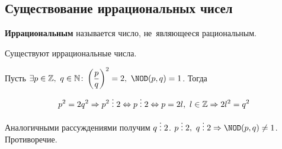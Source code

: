 \subsection{Существование иррациональных чисел}
\textbf{Иррациональным} называется число, не~являющееся рациональным.

\begin{statement}
Существуют иррациональные числа.
\end{statement}
\begin{proofcontra}
Пусть $\exists p \in \mathbb Z, \ q \in \mathbb N \colon
\left( \dfrac{p}q \right)^2 = 2, \ \NOD(p, q) = 1$.
Тогда
\begin{equation*}
p^2 = 2q^2 \Rightarrow p^2 \;\vdots\; 2 \Leftrightarrow p \;\vdots\; 2
\Leftrightarrow p = 2l, \ l \in \mathbb Z \Rightarrow 2l^2 = q^2
\end{equation*}

Аналогичными рассуждениями получим $q \;\vdots\; 2$.
$p \mult 2, \ q \mult 2 \Rightarrow \NOD(p, q) \neq 1$.
Противоречие.
\end{proofcontra}

